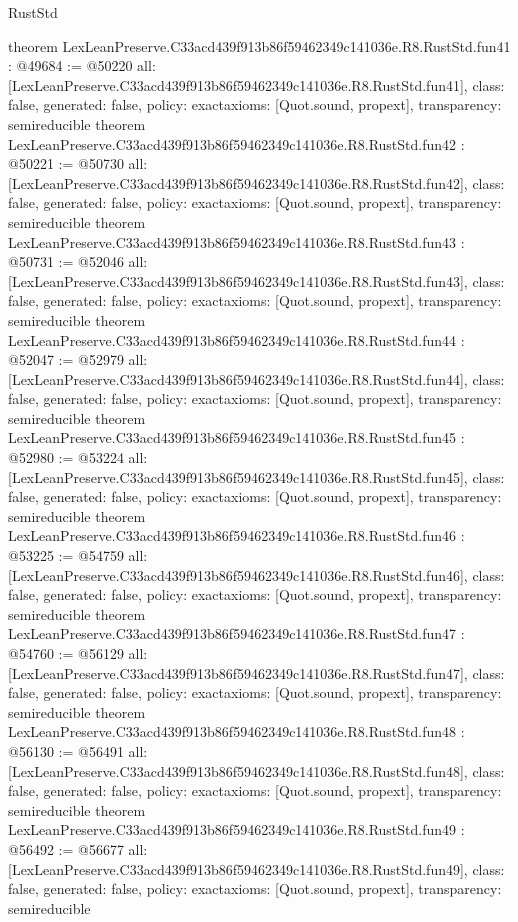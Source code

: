 \begin{lexlean}{RustStd}
\begin{coremodule}
{}
theorem LexLeanPreserve.C33acd439f913b86f59462349c141036e.R8.RustStd.fun41 : @49684 := @50220 {
  all: [LexLeanPreserve.C33acd439f913b86f59462349c141036e.R8.RustStd.fun41],
  class: false,
  generated: false,
  policy: exact{axioms: [Quot.sound, propext]},
  transparency: semireducible
}
theorem LexLeanPreserve.C33acd439f913b86f59462349c141036e.R8.RustStd.fun42 : @50221 := @50730 {
  all: [LexLeanPreserve.C33acd439f913b86f59462349c141036e.R8.RustStd.fun42],
  class: false,
  generated: false,
  policy: exact{axioms: [Quot.sound, propext]},
  transparency: semireducible
}
theorem LexLeanPreserve.C33acd439f913b86f59462349c141036e.R8.RustStd.fun43 : @50731 := @52046 {
  all: [LexLeanPreserve.C33acd439f913b86f59462349c141036e.R8.RustStd.fun43],
  class: false,
  generated: false,
  policy: exact{axioms: [Quot.sound, propext]},
  transparency: semireducible
}
theorem LexLeanPreserve.C33acd439f913b86f59462349c141036e.R8.RustStd.fun44 : @52047 := @52979 {
  all: [LexLeanPreserve.C33acd439f913b86f59462349c141036e.R8.RustStd.fun44],
  class: false,
  generated: false,
  policy: exact{axioms: [Quot.sound, propext]},
  transparency: semireducible
}
theorem LexLeanPreserve.C33acd439f913b86f59462349c141036e.R8.RustStd.fun45 : @52980 := @53224 {
  all: [LexLeanPreserve.C33acd439f913b86f59462349c141036e.R8.RustStd.fun45],
  class: false,
  generated: false,
  policy: exact{axioms: [Quot.sound, propext]},
  transparency: semireducible
}
theorem LexLeanPreserve.C33acd439f913b86f59462349c141036e.R8.RustStd.fun46 : @53225 := @54759 {
  all: [LexLeanPreserve.C33acd439f913b86f59462349c141036e.R8.RustStd.fun46],
  class: false,
  generated: false,
  policy: exact{axioms: [Quot.sound, propext]},
  transparency: semireducible
}
theorem LexLeanPreserve.C33acd439f913b86f59462349c141036e.R8.RustStd.fun47 : @54760 := @56129 {
  all: [LexLeanPreserve.C33acd439f913b86f59462349c141036e.R8.RustStd.fun47],
  class: false,
  generated: false,
  policy: exact{axioms: [Quot.sound, propext]},
  transparency: semireducible
}
theorem LexLeanPreserve.C33acd439f913b86f59462349c141036e.R8.RustStd.fun48 : @56130 := @56491 {
  all: [LexLeanPreserve.C33acd439f913b86f59462349c141036e.R8.RustStd.fun48],
  class: false,
  generated: false,
  policy: exact{axioms: [Quot.sound, propext]},
  transparency: semireducible
}
theorem LexLeanPreserve.C33acd439f913b86f59462349c141036e.R8.RustStd.fun49 : @56492 := @56677 {
  all: [LexLeanPreserve.C33acd439f913b86f59462349c141036e.R8.RustStd.fun49],
  class: false,
  generated: false,
  policy: exact{axioms: [Quot.sound, propext]},
  transparency: semireducible
}
\end{coremodule}
\end{lexlean}
